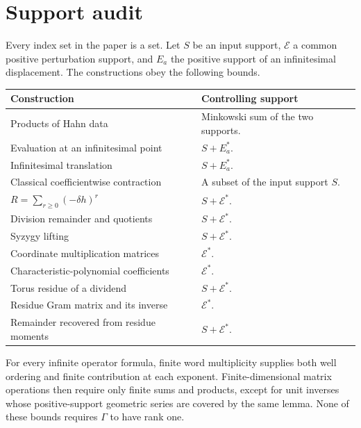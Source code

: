 \documentclass[11pt,letterpaper]{article}
\theoremstyle{definition}
\theoremstyle{remark}
\newcommand{\EE}{\mathcal E}
\numberwithin{equation}{section}
\begin{document}
\section{Support audit}\label{app:support}
Every index set in the paper is a set. Let $S$ be an input support, $\EE$ a common positive perturbation support, and $E_a$ the positive support of an infinitesimal displacement. The constructions obey the following bounds.
\begin{center}\small
\begin{longtable}{@{}L{0.43\textwidth}L{0.48\textwidth}@{}}
\toprule
Construction & Controlling support\\
\midrule
\endhead
Products of Hahn data & Minkowski sum of the two supports.\\[0.35em]
Evaluation at an infinitesimal point & $S+E_a^*$.\\[0.35em]
Infinitesimal translation & $S+E_a^*$.\\[0.35em]
Classical coefficientwise contraction & A subset of the input support $S$.\\[0.35em]
$R=\sum_{r\geq0}(-\delta h)^r$ & $S+\EE^*$.\\[0.35em]
Division remainder and quotients & $S+\EE^*$.\\[0.35em]
Syzygy lifting & $S+\EE^*$.\\[0.35em]
Coordinate multiplication matrices & $\EE^*$.\\[0.35em]
Characteristic-polynomial coefficients & $\EE^*$.\\[0.35em]
Torus residue of a dividend & $S+\EE^*$.\\[0.35em]
Residue Gram matrix and its inverse & $\EE^*$.\\[0.35em]
Remainder recovered from residue moments & $S+\EE^*$.\\
\bottomrule
\end{longtable}
\end{center}
For every infinite operator formula, finite word multiplicity supplies both well ordering and finite contribution at each exponent. Finite-dimensional matrix operations then require only finite sums and products, except for unit inverses whose positive-support geometric series are covered by the same lemma. None of these bounds requires $\Gamma$ to have rank one.
\end{document}
